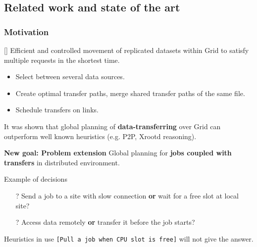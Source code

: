 \documentclass{beamer}
\begin{document}
\begin{frame}
\begin{columns}[c]
 	\end{columns}
\end{frame}

\subsection{Related work and state of the art}
\begin{frame}\frametitle{Motivation}
\begin{footnotesize}
\begin{block}{[\cite{Zerola}]}
Efficient and controlled movement of replicated datasets within Grid to satisfy multiple requests in the shortest time. 
 \begin{itemize}
\item Select between several data sources. 
\item Create optimal transfer paths, merge shared transfer paths of the same file.
\item Schedule transfers on links.
\end{itemize} 
It was shown that global planning of \textbf{data-transferring} over Grid can outperform well known heuristics (e.g. P2P, Xrootd reasoning).
\end{block}  
 		\begin{block}{\textbf{New goal: Problem extension}}
Global planning for \textbf{jobs coupled with transfers} in distributed environment.
 	\end{block} 	
\vspace{-2mm}
\begin{block}{Example of decisions} 
		\begin{itemize}
			\item[?] Send a job to a site with slow connection \textbf{or} wait for a free slot at local site?
		\item[?] Access data remotely \textbf{or} transfer it before the job starts?	
		\end{itemize}
\vspace{-2mm}		
Heuristics in use  \texttt{[Pull a job when CPU slot is free]} will not give the answer.
\end{block}  	 	
\end{footnotesize} 	
\end{frame}
\end{document}
